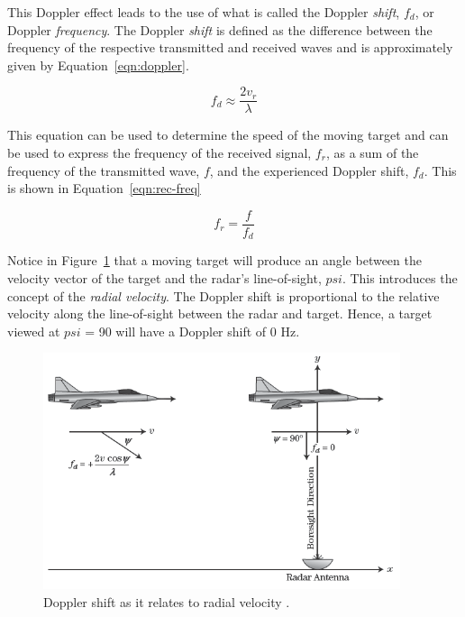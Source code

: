 \documentclass[class=report,11pt,crop=false]{standalone}
\begin{document}
This Doppler effect leads to the use of what is called the Doppler \emph{shift}, $f_d$, or Doppler \emph{frequency}. The Doppler \emph{shift} is defined as the difference between the frequency of the respective transmitted and received waves and is approximately given by Equation~\ref{eqn:doppler}.

\begin{equation}
    f_d \approx \frac{2v_r}{\lambda}
    \label{eqn:doppler}
\end{equation}

This equation can be used to determine the speed of the moving target and can be used to express the frequency of the received signal, $f_r$, as a sum of the frequency of the transmitted wave, $f$, and the experienced Doppler shift, $f_d$. This is shown in Equation~\ref{eqn:rec-freq}

\begin{equation}
    f_r = \frac{f}{f_d}
    \label{eqn:rec-freq}
\end{equation}

Notice in Figure~\ref{fig:radial-velocity} that a moving target will produce an angle between the velocity vector of the target and the \gls{radar}'s line-of-sight, $psi$. This introduces the concept of the \emph{radial velocity}. The Doppler shift is proportional to the relative velocity along the line-of-sight between the \gls{radar} and target. Hence, a target viewed at $psi$ = 90 \deg will have a Doppler shift of 0 Hz.

\begin{figure}[htbp]
    \centering
    \includegraphics[width=0.6\columnwidth]{../Images/doppler_effect.png}
    \caption{Doppler shift as it relates to radial velocity \cite{pomr}.}
    \label{fig:radial-velocity}
\end{figure}
\end{document}
